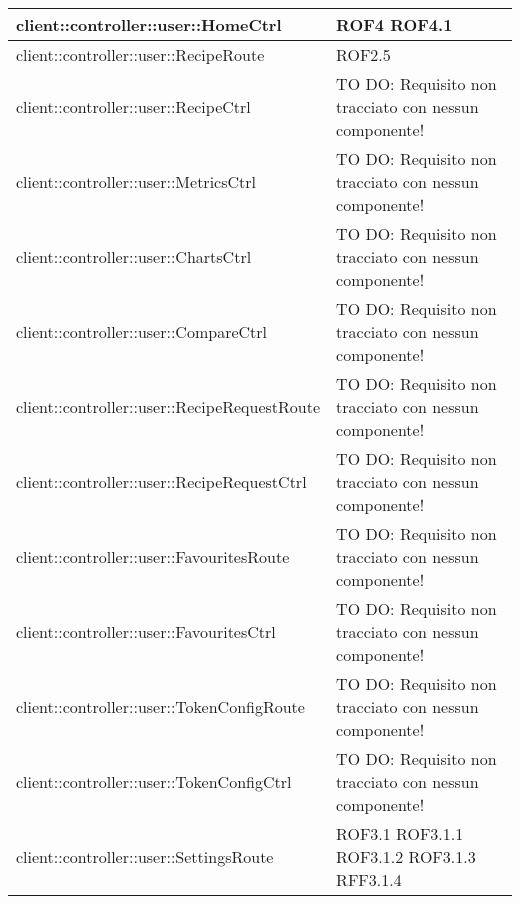 \begin{center}
\begin{longtable}{| p{11cm} | p{2.5cm} |}
\hline
client::controller::user::HomeCtrl & ROF4 \newline ROF4.1 \\
\hline
client::controller::user::RecipeRoute & ROF2.5 \\
\hline
client::controller::user::RecipeCtrl & TO DO: Requisito non tracciato con nessun componente! \\
\hline
client::controller::user::MetricsCtrl & TO DO: Requisito non tracciato con nessun componente! \\
\hline
client::controller::user::ChartsCtrl & TO DO: Requisito non tracciato con nessun componente! \\
\hline
client::controller::user::CompareCtrl & TO DO: Requisito non tracciato con nessun componente! \\
\hline
client::controller::user::RecipeRequestRoute & TO DO: Requisito non tracciato con nessun componente! \\
\hline
client::controller::user::RecipeRequestCtrl & TO DO: Requisito non tracciato con nessun componente! \\
\hline
client::controller::user::FavouritesRoute & TO DO: Requisito non tracciato con nessun componente! \\
\hline
client::controller::user::FavouritesCtrl & TO DO: Requisito non tracciato con nessun componente! \\
\hline
client::controller::user::TokenConfigRoute & TO DO: Requisito non tracciato con nessun componente! \\
\hline
client::controller::user::TokenConfigCtrl & TO DO: Requisito non tracciato con nessun componente! \\
\hline
client::controller::user::SettingsRoute & ROF3.1 \newline ROF3.1.1 \newline ROF3.1.2 \newline ROF3.1.3 \newline RFF3.1.4 \\
\hline

\end{longtable}
\end{center}
